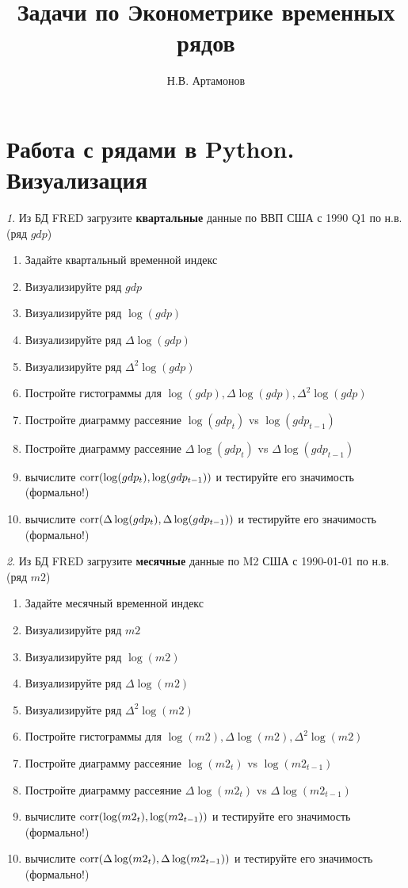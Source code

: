 \documentclass[12pt]{article}
\title{Задачи по Эконометрике временных рядов}
\author{Н.В. Артамонов}
\theoremstyle{remark}
\newtheorem{exercise}{}[subsection]
\begin{document}
\maketitle

\tableofcontents

\section{Работа с рядами в Python. Визуализация}

\begin{exercise}
Из БД FRED загрузите \textbf{квартальные} данные по ВВП США с 1990 Q1 по н.в. (ряд \(gdp\))
\begin{enumerate}
	\item Задайте квартальный временной индекс
	\item Визуализируйте ряд \(gdp\)
	\item Визуализируйте ряд \(\log(gdp)\)
	\item Визуализируйте ряд \(\Delta\log(gdp)\)
	\item Визуализируйте ряд \(\Delta^2\log(gdp)\)
	\item Постройте гистограммы для \(\log(gdp),\Delta\log(gdp),\Delta^2\log(gdp)\)
	\item Постройте диаграмму рассеяние \(\log(gdp_t)\) vs \(\log(gdp_{t-1})\)
	\item Постройте диаграмму рассеяние \(\Delta\log(gdp_t)\) vs \(\Delta\log(gdp_{t-1})\)
	\item вычислите \(\operatorname{corr}(\log(gdp_t), \log(gdp_{t-1}))\) и 
	тестируйте его значимость (формально!)
	\item вычислите \(\operatorname{corr}(\Delta\log(gdp_t), \Delta\log(gdp_{t-1}))\) и 
	тестируйте его значимость (формально!) 
\end{enumerate}
\end{exercise}

\begin{exercise}
Из БД FRED загрузите \textbf{месячные} данные по M2 США с 1990-01-01 по н.в. (ряд \(m2\))
\begin{enumerate}
	\item Задайте месячный временной индекс
	\item Визуализируйте ряд \(m2\)
	\item Визуализируйте ряд \(\log(m2)\)
	\item Визуализируйте ряд \(\Delta\log(m2)\)
	\item Визуализируйте ряд \(\Delta^2\log(m2)\)
	\item Постройте гистограммы для \(\log(m2),\Delta\log(m2),\Delta^2\log(m2)\)
	\item Постройте диаграмму рассеяние \(\log(m2_t)\) vs \(\log(m2_{t-1})\)
	\item Постройте диаграмму рассеяние \(\Delta\log(m2_t)\) vs \(\Delta\log(m2_{t-1})\)
	\item вычислите \(\operatorname{corr}(\log(m2_t), \log(m2_{t-1}))\) и 
	тестируйте его значимость (формально!)
	\item вычислите \(\operatorname{corr}(\Delta\log(m2_t), \Delta\log(m2_{t-1}))\) и 
	тестируйте его значимость (формально!)
\end{enumerate}
\end{exercise}
\end{document}
